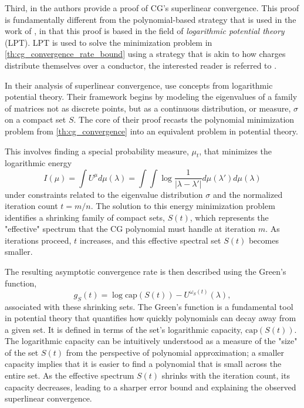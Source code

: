 Third, in \cite{cg_superlinear_Beckermann2001} the authors provide a proof of CG's superlinear convergence. This proof is fundamentally different from the polynomial-based strategy that is used in the work of \cite{cg_sharpened_convrate_Axelsson1976}, in that this proof is based in the field of \textit{logarithmic potential theory} (LPT). LPT is used to solve the minimization problem in \cref{th:cg_convergence_rate_bound} using a strategy that is akin to how charges distribute themselves over a conductor, the interested reader is referred to \cite{from_potential_theory_to_matrix_iterations_in_six_steps_Driscoll1998}. 

In their analysis of superlinear convergence, \citeauthor{cg_superlinear_Beckermann2001} use concepts from logarithmic potential theory. Their framework begins by modeling the eigenvalues of a family of matrices not as discrete points, but as a continuous distribution, or measure, $\sigma$ on a compact set $S$. The core of their proof recasts the polynomial minimization problem from \cref{th:cg_convergence} into an equivalent problem in potential theory.

This involves finding a special probability measure, $\mu_t$, that minimizes the logarithmic energy           
\[
    I(\mu) = \int U^{\mu} d\mu(\lambda) = \int \int \log \frac{1}{|\lambda-\lambda'|} d\mu(\lambda') d\mu(\lambda)
\]
under constraints related to the eigenvalue distribution $\sigma$ and the normalized iteration count $t = m/n$. The solution to this energy minimization problem identifies a shrinking family of compact sets, $S(t)$, which represents the "effective" spectrum that the CG polynomial must handle at iteration $m$. As iterations proceed, $t$ increases, and this effective spectral set $S(t)$ becomes smaller.

The resulting asymptotic convergence rate is then described using the Green's function,
\[
    g_S(t) = \log \text{cap}(S(t)) - U^{\omega_S(t)}(\lambda),
\] 
associated with these shrinking sets. The Green's function is a fundamental tool in potential theory that quantifies how quickly polynomials can decay away from a given set. It is defined in terms of the set's logarithmic capacity, $\text{cap}(S(t))$. The logarithmic capacity can be intuitively understood as a measure of the "size" of the set $S(t)$ from the perspective of polynomial approximation; a smaller capacity implies that it is easier to find a polynomial that is small across the entire set. As the effective spectrum $S(t)$ shrinks with the iteration count, its capacity decreases, leading to a sharper error bound and explaining the observed superlinear convergence.

